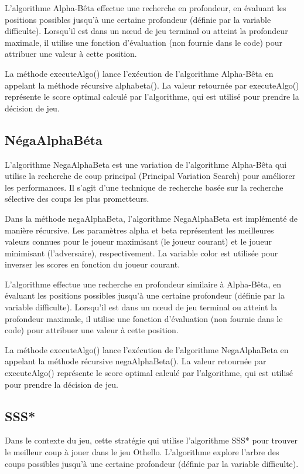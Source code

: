 \documentclass[12pt]{article}
\begin{document}
	L'algorithme Alpha-Bêta effectue une recherche en profondeur, en évaluant les positions possibles jusqu'à une certaine profondeur (définie par la variable difficulte). Lorsqu'il est dans un nœud de jeu terminal ou atteint la profondeur maximale, il utilise une fonction d'évaluation (non fournie dans le code) pour attribuer une valeur à cette position.
	
	La méthode executeAlgo() lance l'exécution de l'algorithme Alpha-Bêta en appelant la méthode récursive alphabeta(). La valeur retournée par executeAlgo() représente le score optimal calculé par l'algorithme, qui est utilisé pour prendre la décision de jeu.
	\subsection{NégaAlphaBéta}
	L'algorithme NegaAlphaBeta est une variation de l'algorithme Alpha-Bêta qui utilise la recherche de coup principal (Principal Variation Search) pour améliorer les performances. Il s'agit d'une technique de recherche basée sur la recherche sélective des coups les plus prometteurs.
	
	Dans la méthode negaAlphaBeta, l'algorithme NegaAlphaBeta est implémenté de manière récursive. Les paramètres alpha et beta représentent les meilleures valeurs connues pour le joueur maximisant (le joueur courant) et le joueur minimisant (l'adversaire), respectivement. La variable color est utilisée pour inverser les scores en fonction du joueur courant.
	
	L'algorithme effectue une recherche en profondeur similaire à Alpha-Bêta, en évaluant les positions possibles jusqu'à une certaine profondeur (définie par la variable difficulte). Lorsqu'il est dans un nœud de jeu terminal ou atteint la profondeur maximale, il utilise une fonction d'évaluation (non fournie dans le code) pour attribuer une valeur à cette position.
	
	La méthode executeAlgo() lance l'exécution de l'algorithme NegaAlphaBeta en appelant la méthode récursive negaAlphaBeta(). La valeur retournée par executeAlgo() représente le score optimal calculé par l'algorithme, qui est utilisé pour prendre la décision de jeu.
	\subsection{SSS*}
	Dans le contexte du jeu, cette stratégie qui utilise l'algorithme SSS* pour trouver le meilleur coup à jouer dans le jeu Othello. L'algorithme explore l'arbre des coups possibles jusqu'à une certaine profondeur (définie par la variable difficulte).
	
\end{document}
